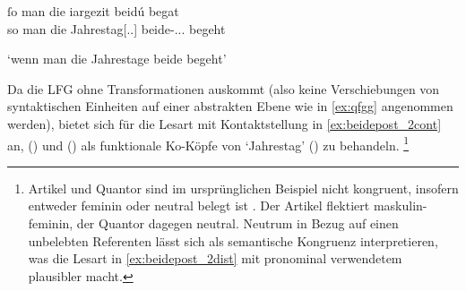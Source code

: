 \begin{exe}

	\ex \label{ex:beidepost_2}
		\gll ſo man die iargezit beidú begat \\
			so man die Jahrestag[\Acc.\Pl.\NeutI] beide-\Acc.\Pl.\NeutI.\St{}
			begeht \\
		\begin{taggedline}{\parencites(Straßburg und Colmar, 1299)[\pno~3331, 468.21--22]{cao4}}
		\trans `wenn man die Jahrestage beide begeht'
		\end{taggedline}

\end{exe}

Da die LFG ohne Transformationen auskommt (also keine Verschiebungen von
syntaktischen Einheiten auf einer abstrakten Ebene wie in \cref{ex:qfgg}
angenommen werden), bietet sich für die Lesart mit Kontaktstellung in
\cref{ex:beidepost_2cont} an,
 () und  () als funktionale Ko-Köpfe
von  `Jahrestag' () zu behandeln.%
%
	\footnote{Artikel und Quantor sind im ursprünglichen Beispiel nicht
		kongruent, insofern  entweder feminin oder neutral belegt
		ist \autocite[s.\,v.~]{lexer:mhdhwb}. Der Artikel 
		flektiert maskulin-feminin, der Quantor  dagegen neutral.
		Neutrum in Bezug auf einen unbelebten Referenten lässt sich als
		semantische Kongruenz interpretieren, was die Lesart in
		\cref{ex:beidepost_2dist} mit pronominal verwendetem 
		plausibler macht.}

